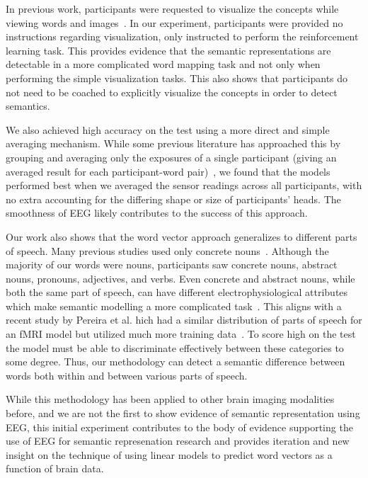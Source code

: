In previous work, participants were requested to visualize the concepts while 
viewing words and images~\cite{Mitchell2008,Sudre2012}. In our experiment, 
participants were provided no instructions regarding visualization, only 
instructed to perform the reinforcement learning task. This provides evidence 
that the semantic representations are detectable in a more complicated word 
mapping task and not only when performing the simple visualization tasks. This 
also shows that participants do not need to be coached to explicitly visualize 
the concepts in order to detect semantics.

We also achieved high accuracy on the \tvt test using a more direct and simple 
averaging mechanism. While some previous literature has approached this by 
grouping and averaging only the exposures of a single participant (giving an 
averaged result for each participant-word pair)~\cite{Mitchell2008,Sudre2012}, 
we found that the models performed best when we averaged the sensor readings 
across all participants, with no extra accounting for the differing shape or 
size of participants' heads. The smoothness of EEG likely contributes to the 
success of this approach.

Our work also shows that the word vector approach generalizes to different 
parts of speech. Many previous studies used only concrete 
nouns~\cite{Mitchell2008,Sudre2012,Murphy2009}. Although the majority of our 
words were nouns, participants saw concrete nouns, abstract nouns, pronouns, 
adjectives, and verbs. Even concrete and abstract nouns, while both the same 
part of speech, can have different electrophysiological attributes which make 
semantic modelling a more complicated task~\cite{barber2013concreteness}. This 
aligns with a recent study by Pereira et al.  hich had a similar distribution 
of parts of speech for an fMRI model but utilized much more training 
data~\cite{pereira2018toward}. To score high on the \tvt test the model must be 
able to discriminate effectively between these categories to some degree. Thus, 
our methodology can detect a semantic difference between words both within and 
between various parts of speech.

While this methodology has been applied to other brain imaging modalities 
before, and we are not the first to show evidence of semantic representation 
using EEG, this initial experiment contributes to the body of evidence 
supporting the use of EEG for semantic represenation research and provides 
iteration and new insight on the technique of using linear models to predict 
word vectors as a function of brain data.
